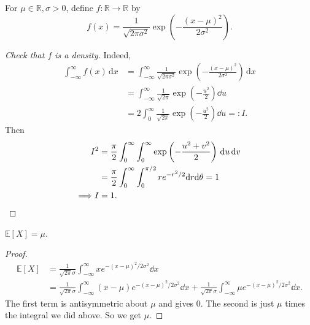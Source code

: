 \begin{example}
    For $\mu\in\mathbb R,\sigma>0$, define $ f: \mathbb{R}\to \mathbb{R} $ by
    \[
        f(x) = \frac{1}{\sqrt{2\pi\sigma^2}}\exp\left(-\frac{(x - \mu)^2}{2\sigma^2}\right).
    \]
    \begin{center}
    \end{center}
    \begin{proof}[Check that $f$ is a density]
        Indeed, 
        \begin{align*}
            \int_{-\infty}^{\infty} f(x) \,\mathrm{d}x &= \int_{-\infty}^{\infty} \frac{1}{\sqrt{2\pi\sigma^2}}\exp\left(-\frac{(x - \mu)^2}{2\sigma^2}\right) \,\mathrm{d}x\\ 
            &= \int_{-\infty}^{\infty} \frac{1}{\sqrt{2\pi}}\exp \left( -\frac{u^2}{2} \right)\dd u\\ 
            &= 2 \int_{0}^{\infty} \frac{1}{\sqrt{2\pi}} \exp \left( -\frac{u^2}{2} \right)\dd u=:I.
        \end{align*}
        Then
        \begin{align*}
          I^2 &= \frac{\pi}{2} \int_{0}^{\infty} \int_{0}^{\infty} \exp \left( -\frac{u^2+v^2}{2} \right) \,\mathrm{d}u\,\mathrm{d}v\\ 
          &= \frac{\pi}{2}\int_0^\infty \int_0^{\pi/2}re^{-r^2/2}\dd r\dd \theta=1\\ 
          \Longrightarrow I&=1.\qedhere
        \end{align*}
    \end{proof}
    \begin{proposition}
        $\mathbb{E}[X] = \mu$.
    \end{proposition}
    \begin{proof}
    \begin{align*}
    \mathbb{E}[X] &= \frac{1}{\sqrt{2\pi}\sigma} \int_{-\infty}^\infty x e^{-(x - \mu)^2/2\sigma^2}\dd x\\
    &= \frac{1}{\sqrt{2\pi} \sigma}\int_{-\infty}^\infty (x - \mu)e^{-(x - \mu)^2/2\sigma^2}\dd x + \frac{1}{\sqrt{2\pi}\sigma}\int_{-\infty}^\infty \mu e^{-(x - \mu)^2/2\sigma^2}\dd x.
    \end{align*}
    The first term is antisymmetric about $\mu$ and gives $0$. The second is just $\mu$ times the integral we did above. So we get $\mu$.

\end{proof}
\end{example}
